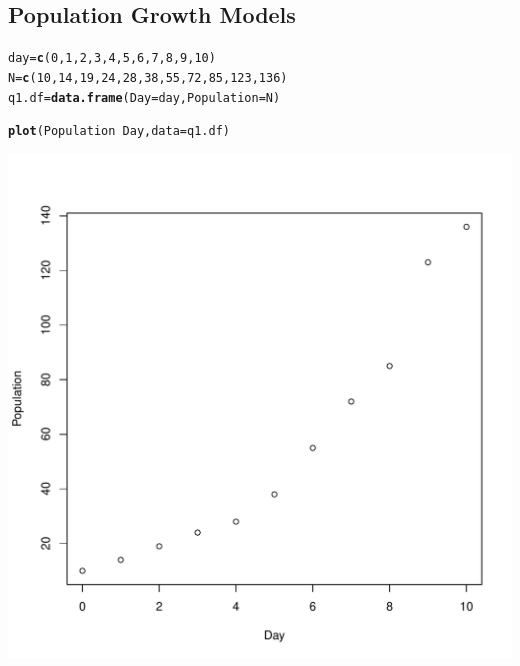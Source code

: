 \documentclass[12pt]{article}\usepackage[]{graphicx}\usepackage[]{color}
\makeatletter
\def\maxwidth{ %
  \ifdim\Gin@nat@width>\linewidth
    \linewidth
  \else
    \Gin@nat@width
  \fi
}
\newcommand{\hlnum}[1]{\textcolor[rgb]{0.686,0.059,0.569}{#1}}%
\newcommand{\hlopt}[1]{\textcolor[rgb]{0,0,0}{#1}}%
\newcommand{\hlstd}[1]{\textcolor[rgb]{0.345,0.345,0.345}{#1}}%
\newcommand{\hlkwb}[1]{\textcolor[rgb]{0.69,0.353,0.396}{#1}}%
\newcommand{\hlkwc}[1]{\textcolor[rgb]{0.333,0.667,0.333}{#1}}%
\newcommand{\hlkwd}[1]{\textcolor[rgb]{0.737,0.353,0.396}{\textbf{#1}}}%
\newenvironment{kframe}{%
 \def\at@end@of@kframe{}%
 \ifinner\ifhmode%
  \def\at@end@of@kframe{\end{minipage}}%
  \begin{minipage}{\columnwidth}%
 \fi\fi%
 \def\FrameCommand##1{\hskip\@totalleftmargin \hskip-\fboxsep
 \colorbox{shadecolor}{##1}\hskip-\fboxsep
     \hskip-\linewidth \hskip-\@totalleftmargin \hskip\columnwidth}%
 \MakeFramed {\advance\hsize-\width
   \@totalleftmargin\z@ \linewidth\hsize
   \@setminipage}}%
 {\par\unskip\endMakeFramed%
 \at@end@of@kframe}
\newenvironment{knitrout}{}{} %
\makeatother
\begin{document}
\LARGE
\thispagestyle{empty}

\subsection{Population Growth Models}

\begin{knitrout}
\color{fgcolor}\begin{kframe}
\begin{alltt}
\hlstd{day} \hlkwb{=} \hlkwd{c}\hlstd{(}\hlnum{0}\hlstd{,} \hlnum{1}\hlstd{,} \hlnum{2}\hlstd{,} \hlnum{3}\hlstd{,} \hlnum{4}\hlstd{,} \hlnum{5}\hlstd{,} \hlnum{6}\hlstd{,} \hlnum{7}\hlstd{,} \hlnum{8}\hlstd{,} \hlnum{9}\hlstd{,} \hlnum{10}\hlstd{)}
\hlstd{N} \hlkwb{=} \hlkwd{c}\hlstd{(}\hlnum{10}\hlstd{,} \hlnum{14}\hlstd{,} \hlnum{19}\hlstd{,} \hlnum{24}\hlstd{,} \hlnum{28}\hlstd{,} \hlnum{38}\hlstd{,} \hlnum{55}\hlstd{,} \hlnum{72}\hlstd{,} \hlnum{85}\hlstd{,} \hlnum{123}\hlstd{,} \hlnum{136}\hlstd{)}
\hlstd{q1.df} \hlkwb{=} \hlkwd{data.frame}\hlstd{(}\hlkwc{Day} \hlstd{= day,} \hlkwc{Population} \hlstd{= N)}
\end{alltt}
\end{kframe}
\end{knitrout}

\begin{knitrout}
\color{fgcolor}\begin{kframe}
\begin{alltt}
\hlkwd{plot}\hlstd{(Population} \hlopt{~} \hlstd{Day,} \hlkwc{data}\hlstd{=q1.df)}
\end{alltt}
\end{kframe}
\includegraphics[width=\maxwidth]{figure/unnamed-chunk-2-1} 

\end{knitrout}
\end{document}
